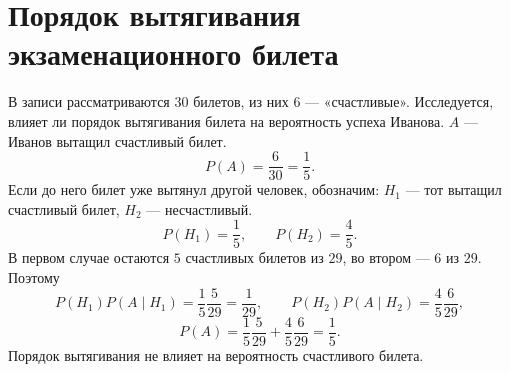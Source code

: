 \section*{Порядок вытягивания экзаменационного билета}
В записи рассматриваются $30$ билетов, из них $6$ --- «счастливые».
Исследуется, влияет ли порядок вытягивания билета на вероятность успеха Иванова.
$A$ --- Иванов вытащил счастливый билет.
\[
 P(A)=\frac6{30}=\frac15.
\]
Если до него билет уже вытянул другой человек, обозначим:
$H_1$ --- тот вытащил счастливый билет, $H_2$ --- несчастливый.
\[
 P(H_1)=\frac15,\qquad P(H_2)=\frac45.
\]
В первом случае остаются $5$ счастливых билетов из $29$,
во втором --- $6$ из $29$. Поэтому
\[
 P(H_1)P(A\mid H_1)=\frac15\frac5{29}=\frac1{29},\qquad
 P(H_2)P(A\mid H_2)=\frac45\frac6{29},
\]
\[
 P(A)=\frac15\frac5{29}+\frac45\frac6{29}=\frac15.
\]
Порядок вытягивания не влияет на вероятность счастливого билета.

